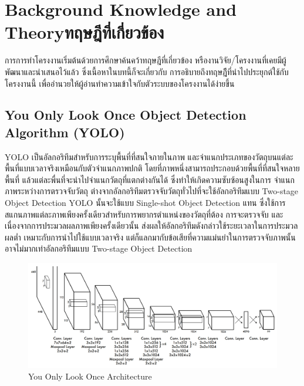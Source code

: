 \chapter{\ifenglish Background Knowledge and Theory\else ทฤษฎีที่เกี่ยวข้อง\fi}

การการทําโครงงานเริ่มต้นด้วยการศึกษาค้นคว้าทฤษฎีที่เกี่ยวข้อง หรืองานวิจัย/โครงงานที่เคยมีผู้พัฒนาและนําเสนอไว้แล้ว ซึ่งเนื้อหาในบทนี้ก็จะเกี่ยวกับ
การอธิบายถึงทฤษฎีีที่นำไปประยุกต์ใช้กับโครงงานนี้ เพื่ออำนวยให้ผู้อ่านทำความเข้าใจกับตัวระบบของโครงงานได้ง่ายขึ้น

\section{You Only Look Once Object Detection Algorithm (YOLO)}
YOLO เป็นอัลกอริทึมสำหรับการระบุพื้นที่ที่สนใจภายในภาพ และจำแนกประเภทของวัตถุบนแต่ละพื้นที่แบบเวลาจริงเหมือนกับตัวจำแนกภาพปกติ 
โดยที่ภาพหนึ่งสามารถประกอบด้วยพื้นที่ที่สนใจหลายพื้นที่ แล้วแต่ละพื่นที่จะนำไปจำแนกวัตถุที่แตกต่างกันได้ ซึ่งทำให้เกิดความซับซ้อนสูงในการ
จำแนกภาพระหว่างการตรวจจับวัตถุ ต่างจากอัลกอริทึมตรวจจับวัตถุทั่วไปที่จะใช้อัลกอริทึมแบบ Two-stage Object Detection YOLO 
นั้นจะใช้แบบ Single-shot Object Detection แทน ซึ่งใช้การสแกนภาพแต่ละภาพเพียงครั้งเดียวสำหรับการพยากรตำแหน่งของวัตถุที่ต้อง
การจะตรวจจับ และเนื่องจากการประมวลผลภาพเพียงครั้งเดียวนั้น ส่งผลให้อัลกอริทึมดังกล่าวใช้ระยะเวลาในการประมวลผลต่ำ 
เหมาะกับการนำไปใช้แบบเวลาจริง แต่ก็แลกมากับข้อเสียที่ความแม่นยำในการตรวจจับภาพนั้นอาจไม่มากเท่าอัลกอริทึมแบบ Two-stage Object Detection 
\begin{figure}[h]
  \begin{center}
  \includegraphics[scale=0.2]{resources/YOLO.png}
  \end{center}
  \caption[YOLO Architecture]{You Only Look Once Architecture}
  \label{fig:yolo architecture}
\end{figure}


